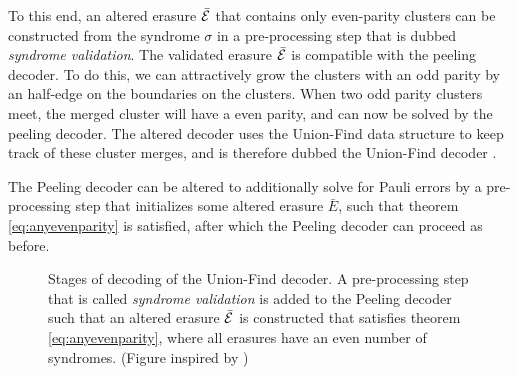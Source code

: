To this end, an altered erasure $\bar{\mathcal{E}}$ that contains only even-parity clusters can be constructed from the syndrome $\sigma$ in a pre-processing step that is dubbed \emph{syndrome validation}. The validated erasure $\bar{\mathcal{E}}$ is compatible with the peeling decoder. To do this, we can attractively grow the clusters with an odd parity by an half-edge on the boundaries on the clusters. When two odd parity clusters meet, the merged cluster will have a even parity, and can now be solved by the peeling decoder. The altered decoder uses the Union-Find data structure to keep track of these cluster merges, and is therefore dubbed the Union-Find decoder \cite{delfosse2017almost}.
\begin{proposition}
  The Peeling decoder can be altered to additionally solve for Pauli errors by a pre-processing step that initializes some altered erasure $\bar{E}$, such that theorem \ref{eq:anyevenparity} is satisfied, after which the Peeling decoder can proceed as before. 
\end{proposition}
\begin{figure}[]
  \centering
  \caption{Stages of decoding of the Union-Find decoder. A pre-processing step that is called \emph{syndrome validation} is added to the Peeling decoder such that an altered erasure $\bar{\mathcal{E}}$ is constructed that satisfies theorem \ref{eq:anyevenparity}, where all erasures have an even number of syndromes. (Figure inspired by \cite{delfosse2017almost})} 
  \label{fig:ufstages}
\end{figure}

